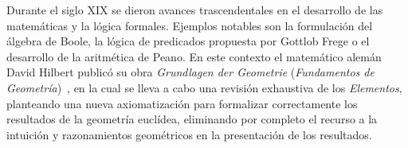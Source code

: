 Durante el siglo XIX se dieron avances trascendentales en el desarrollo de las
matemáticas y la lógica formales. Ejemplos notables son la
formulación del álgebra de Boole, la lógica de predicados propuesta por
Gottlob Frege o el desarrollo de la aritmética de Peano.
En este contexto el matemático alemán David Hilbert publicó su obra
\textit{Grundlagen der Geometrie} (\textit{Fundamentos de Geometría})~\cite{hilbertFoundationsGeometry1950}, en la cual se
lleva a cabo una revisión exhaustiva de los \textit{Elementos}, planteando una
nueva axiomatización para formalizar correctamente los resultados de la
geometría euclídea, eliminando por completo el recurso a la intuición y
razonamientos geométricos en la presentación de los resultados.







